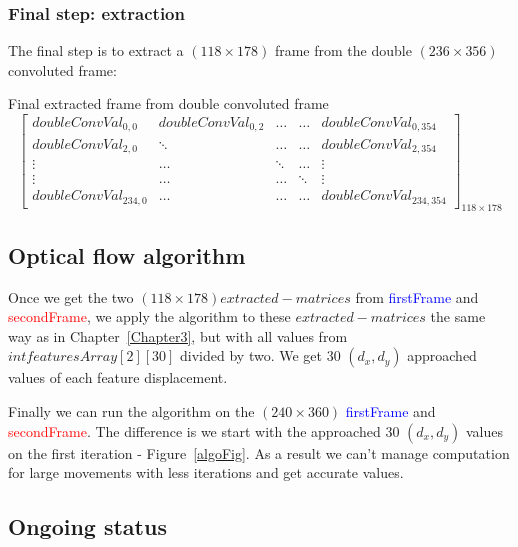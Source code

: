 \subsubsection{Final step: extraction}

The final step is to extract a $(118\times 178)$ frame from the double $(236\times 356)$ convoluted frame:

\vspace{10mm}
Final extracted frame from double convoluted frame
\[
\begin{bmatrix}

doubleConvVal_{0,0} & doubleConvVal_{0,2} & \ldots & \ldots & doubleConvVal_{0,354}\\

doubleConvVal_{2,0} & \ddots & \ldots & \ldots & doubleConvVal_{2,354}\\

\vdots & \ldots & \ddots & \ldots & \vdots\\

\vdots & \ldots & \ldots & \ddots & \vdots\\

doubleConvVal_{234,0} & \ldots & \ldots  & \ldots & doubleConvVal_{234,354}

\end{bmatrix}_{118\times 178}
\]


\subsection{Optical flow algorithm}

Once we get the two $(118\times 178) extracted-matrices$ from \textcolor{blue}{firstFrame} and \textcolor{red}{secondFrame}, we apply the \flow{} algorithm to these $extracted-matrices$ the same way as in Chapter~\ref{Chapter3}, but with all values from $int featuresArray[2][30]$ divided by two. We get 30 $(d_{x},d_{y})$ approached values of each feature displacement.

Finally we can run the \flow{} algorithm on the $(240\times 360)$ \textcolor{blue}{firstFrame} and \textcolor{red}{secondFrame}. The difference is we start with the approached 30 $(d_{x},d_{y})$ values on the first iteration - Figure~\ref{algoFig}. As a result we can't manage \flow{} computation for large movements with less iterations and get accurate values.


\subsection{Ongoing status}

